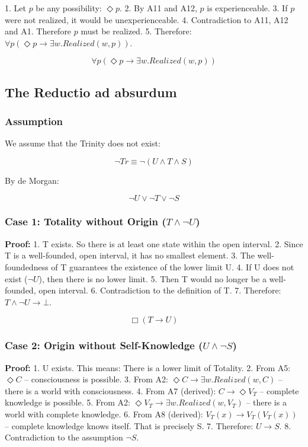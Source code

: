 \documentclass[
]{article}
\begin{document}
1. Let \(p\) be any possibility: \(\Diamond p\).
2. By A11 and A12, \(p\) is experienceable.
3. If \(p\) were not realized, it would be unexperienceable.
4. Contradiction to A11, A12 and A1. Therefore \(p\) must be realized.
5. Therefore: \(\forall p(\Diamond p \rightarrow \exists w. Realized(w,p))\).

\[
\boxed{\forall p(\Diamond p \rightarrow \exists w. Realized(w,p))}
\]

\subsection{The Reductio ad absurdum}\label{the-reductio-ad-absurdum}

\subsubsection{Assumption}\label{assumption}

We assume that the Trinity does not exist:

\[
\neg Tr \equiv \neg(U \land T \land S)
\]

By de Morgan:

\[
\neg U \lor \neg T \lor \neg S
\]

\subsubsection{Case 1: Totality without Origin (\(T \land \neg U\))}\label{case-1-totality-without-origin-t-land-neg-u}

\textbf{Proof:}
1. T exists. So there is at least one state within the open interval.
2. Since T is a well-founded, open interval, it has no smallest element.
3. The well-foundedness of T guarantees the existence of the lower limit U.
4. If U does not exist (\(\neg U\)), then there is no lower limit.
5. Then T would no longer be a well-founded, open interval.
6. Contradiction to the definition of T.
7. Therefore: \(T \land \neg U \rightarrow \bot\).

\[
\boxed{\Box(T \rightarrow U)}
\]

\subsubsection{Case 2: Origin without Self-Knowledge (\(U \land \neg S\))}\label{case-2-origin-without-self-knowledge-u-land-neg-s}

\textbf{Proof:}
1. U exists. This means: There is a lower limit of Totality.
2. From A5: \(\Diamond C\) – consciousness is possible.
3. From A2: \(\Diamond C \rightarrow \exists w. Realized(w,C)\) – there is a world with consciousness.
4. From A7 (derived): \(C \rightarrow \Diamond V_T\) – complete knowledge is possible.
5. From A2: \(\Diamond V_T \rightarrow \exists w. Realized(w,V_T)\) – there is a world with complete knowledge.
6. From A8 (derived): \(V_T(x) \rightarrow V_T(V_T(x))\) – complete knowledge knows itself. That is precisely S.
7. Therefore: \(U \rightarrow S\).
8. Contradiction to the assumption \(\neg S\).
\end{document}

